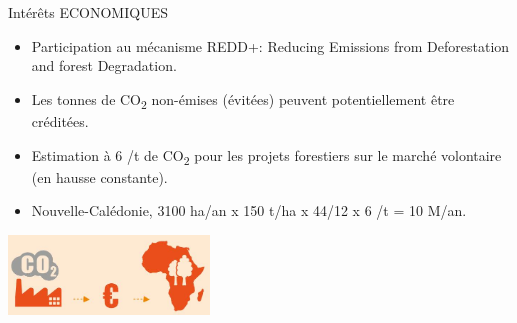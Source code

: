 \documentclass[10pt,table,dvipsnames,compress]{beamer}
\begin{document}
\begin{frame}[label={sec:orgf6cc517}]{Intérêts ECONOMIQUES}
\begin{itemize}
\item Participation au mécanisme REDD+: Reducing Emissions from Deforestation and forest Degradation.
\item Les tonnes de CO\textsubscript{2} non-émises (évitées) peuvent \alert{potentiellement} être créditées.
\item Estimation à 6 \texteuro{}/t de CO\textsubscript{2} pour les projets forestiers sur le marché volontaire (en hausse constante).
\item Nouvelle-Calédonie, 3100 ha/an x 150 t/ha x 44/12 x 6 \texteuro{}/t = 10 M\texteuro{}/an.
\end{itemize}

\begin{center}
\includegraphics[width=0.4\textwidth]{figs/REDD.jpg}
\end{center}
\end{frame}
\end{document}
